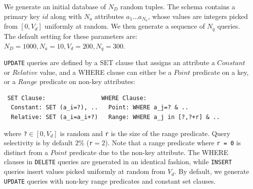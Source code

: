 
 \label{sec:syntheticgen}
We generate an initial database of $N_D$ random tuples.  
The schema contains a primary key $id$ along with $N_a$ attributes $a_1\ldots a_{N_a}$, whose values are integers picked from $[0, V_d]$ uniformly at random.
We then generate a sequence of $N_q$ queries.
The default setting for these parameters are: $N_D = 1000, N_a = 10, V_d = 200, N_q = 300$.


\noindent \texttt{UPDATE} queries are defined by a SET clause that assigns an attribute a $Constant$ or $Relative$ value,
and a WHERE clause can either be a $Point$ predicate on a key, or a $Range$ predicate on non-key attributes:
{\scriptsize
\begin{verbatim}
 SET Clause:                WHERE Clause:
  Constant: SET (a_i=?), ..   Point: WHERE a_j=? & ..
  Relative: SET (a_i=a_i+?)   Range: WHERE a_j in [?,?+r] & ..\end{verbatim} }
where \verb|?|$\in [0, V_d]$ is random and \verb|r| is the size of the range predicate. 
Query selectivity is by default $2\%$ (\verb|r|$=2$).
Note that a range predicate where \texttt{r = 0} is distinct from a $Point$ predicate due to the non-key attribute.
The WHERE clauses in \texttt{DELETE} queries are generated in an identical fashion, while
\texttt{INSERT} queries insert values picked uniformly at random from $V_d$.
By default, we generate \texttt{UPDATE} queries with non-key range predicates and constant set clauses.

% 

